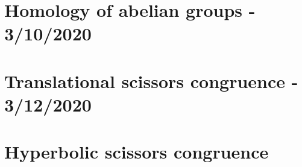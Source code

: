 \documentclass[a4paper,10pt]{article}
\begin{document}
\section{Homology of abelian groups - 3/10/2020}

\newpage

\section{Translational scissors congruence - 3/12/2020}

\newpage

\section{Hyperbolic scissors congruence}

\newpage

\printindex
\newpage
\end{document}
